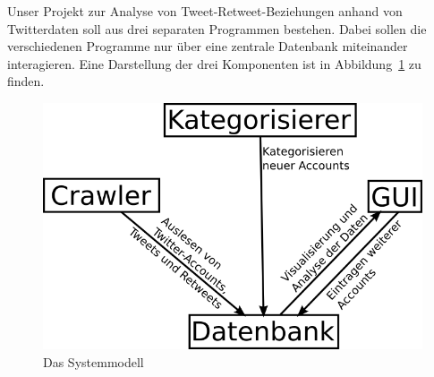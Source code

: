 Unser Projekt zur Analyse von Tweet-Retweet-Beziehungen anhand von Twitterdaten soll aus drei separaten Programmen bestehen. Dabei sollen die verschiedenen Programme nur über eine zentrale Datenbank miteinander interagieren. Eine Darstellung der drei Komponenten ist in Abbildung~\ref{c:systemmodell} zu finden.

\begin{figure}[h]
	\centering
	\includegraphics[scale=2]{img/Systemmodell.png}
	\caption{Das Systemmodell}
	\label{c:systemmodell}
\end{figure}

